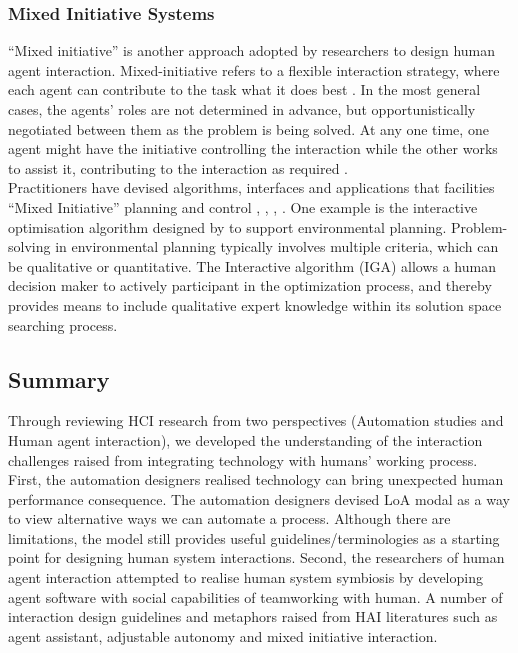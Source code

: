 \subsubsection{Mixed Initiative Systems}
``Mixed initiative'' is another approach adopted by researchers to design human agent interaction.  Mixed-initiative refers to a flexible interaction strategy, where each agent can contribute to the task what it does best \cite{Allen1999}. In the most general cases, the agents' roles are not determined in advance, but opportunistically negotiated between them as the problem is being solved. At any one time, one agent might have the initiative controlling the interaction while the other works to assist it, contributing to the interaction as required \cite{Horvitz1999}.\\

Practitioners have devised algorithms, interfaces and applications that facilities ``Mixed Initiative'' planning and control \cite{Ferguson1996}, \cite{Burstein2003}, \cite{Hardin2009}, \cite{Zimmerman2007} . One example is the interactive optimisation algorithm designed by \cite{Yang2012} to support environmental planning. Problem-solving in environmental planning typically involves multiple criteria, which can be qualitative or quantitative. The Interactive algorithm (IGA) allows a human decision maker to actively participant in the optimization process, and thereby provides means to include qualitative expert knowledge within its solution space searching process.\\


\subsection{Summary}
Through reviewing HCI research from two perspectives (Automation studies and Human agent interaction), we developed the understanding of the interaction challenges raised from integrating technology with humans' working process.  First, the automation designers realised technology can bring unexpected human performance consequence. The automation designers devised LoA modal as a way to view alternative ways we can automate a process. Although there are limitations, the model still provides useful guidelines/terminologies as a starting point for designing human system interactions. Second, the researchers of human agent interaction attempted to realise human system symbiosis by developing agent software with social capabilities of teamworking with human. A number of interaction design guidelines and metaphors raised from HAI literatures such as agent assistant, adjustable autonomy and mixed initiative interaction.  \\ 


